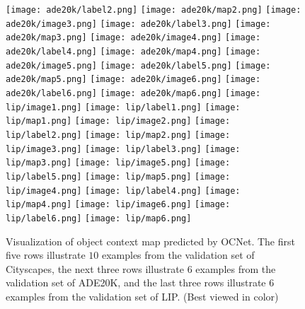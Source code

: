 \documentclass[10pt,twocolumn,letterpaper]{article}
\begin{document}
\begin{figure*}[htb]
\texttt{[image: ade20k/label2.png]}
\texttt{[image: ade20k/map2.png]}
\vspace{.05cm}
\texttt{[image: ade20k/image3.png]}
\texttt{[image: ade20k/label3.png]}
\texttt{[image: ade20k/map3.png]}
\texttt{[image: ade20k/image4.png]}
\texttt{[image: ade20k/label4.png]}
\texttt{[image: ade20k/map4.png]}
\vspace{.05cm}
\texttt{[image: ade20k/image5.png]}
\texttt{[image: ade20k/label5.png]}
\texttt{[image: ade20k/map5.png]}
\texttt{[image: ade20k/image6.png]}
\texttt{[image: ade20k/label6.png]}
\texttt{[image: ade20k/map6.png]}
\vspace{.05cm}
\texttt{[image: lip/image1.png]}
\texttt{[image: lip/label1.png]}
\texttt{[image: lip/map1.png]}
\texttt{[image: lip/image2.png]}
\texttt{[image: lip/label2.png]}
\texttt{[image: lip/map2.png]}
\vspace{.05cm}
\texttt{[image: lip/image3.png]}
\texttt{[image: lip/label3.png]}
\texttt{[image: lip/map3.png]}
\texttt{[image: lip/image5.png]}
\texttt{[image: lip/label5.png]}
\texttt{[image: lip/map5.png]}
\vspace{.05cm}
\texttt{[image: lip/image4.png]}
\texttt{[image: lip/label4.png]}
\texttt{[image: lip/map4.png]}
\texttt{[image: lip/image6.png]}
\texttt{[image: lip/label6.png]}
\texttt{[image: lip/map6.png]}
\vspace{.05cm}
\vspace{.05cm}
\caption{\small{Visualization of object context map predicted by OCNet. The first five rows illustrate $10$ examples from the validation set of Cityscapes, the next three rows illustrate $6$ examples from the validation set of ADE20K, and the last three rows illustrate $6$ examples from the validation set of LIP. (Best viewed in color)}}
\label{fig:vis_ocmap}
\end{figure*}
\end{document}
